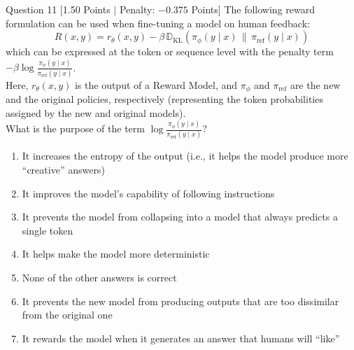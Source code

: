 \documentclass[11pt,a4paper]{article}
\begin{document}
\begin{questionbox}{Question 11 \hfill [1.50 Points $\vert$ Penalty: $-0.375$ Points]}
The following reward formulation can be used when fine-tuning a model on human feedback:
\begin{equation*}
    R(x, y) = r_\theta(x, y) - \beta \, \mathbb{D}_{\text{KL}}\left(\pi_\phi(y \mid x) \,\|\, \pi_{\text{ref}}(y \mid x)\right)
\end{equation*}
which can be expressed at the token or sequence level with the penalty term $-\beta \log \frac{\pi_\phi(y \mid x)}{\pi_{\text{ref}}(y \mid x)}$.\\
Here, $r_\theta(x, y)$ is the output of a Reward Model, and $\pi_\phi$ and $\pi_{\text{ref}}$ are the new and the original policies, respectively (representing the token probabilities assigned by the new and original models).\\
What is the purpose of the term $\log \frac{\pi_\phi(y \mid x)}{\pi_{\text{ref}}(y \mid x)}$?

\begin{enumerate}[label=\alph*.,leftmargin=2em]
    \item It increases the entropy of the output (i.e., it helps the model produce more ``creative'' answers)
    \item It improves the model's capability of following instructions
    \item It prevents the model from collapsing into a model that always predicts a single token
    \item It helps make the model more deterministic
    \item None of the other answers is correct
    \item It prevents the new model from producing outputs that are too dissimilar from the original one
    \item It rewards the model when it generates an answer that humans will ``like''
\end{enumerate}
\end{questionbox}
\end{document}
